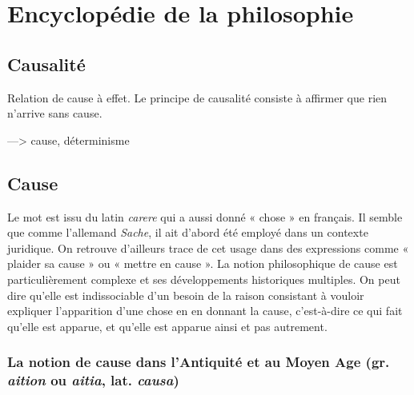
\section{Encyclopédie de la philosophie}
\subsection{Causalité}
Relation de cause à effet. Le
principe de causalité consiste à affirmer
que rien n’arrive sans cause.

—> cause, déterminisme

 

\subsection{Cause}
Le mot est issu du latin {\it carere} qui a
aussi donné « chose » en français. Il
semble que comme l’allemand {\it Sache}, il ait
d’abord été employé dans un contexte
juridique. On retrouve d’ailleurs trace de
cet usage dans des expressions comme
« plaider sa cause » ou « mettre en cause ».
La notion philosophique de cause est
particulièrement complexe et ses développements historiques multiples. On peut
dire qu’elle est indissociable d’un besoin
de la raison consistant à vouloir expliquer
l'apparition d’une chose en en donnant la
cause, c’est-à-dire ce qui fait qu’elle est
apparue, et qu’elle est apparue ainsi et
pas autrement.

\subsubsection{La notion de cause dans
l'Antiquité et au Moyen Age (gr. {\it aition}
ou {\it aitia}, lat. {\it causa})}


